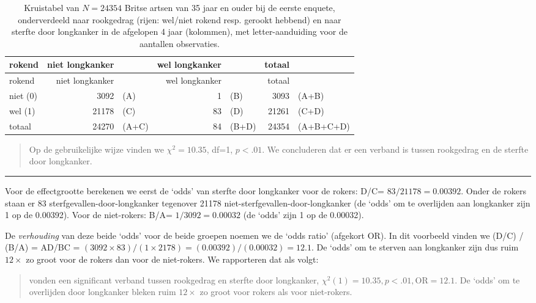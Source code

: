 \documentclass[
]{book}
\begin{document}
\begin{longtable}[]{@{}lrlrlrl@{}}
\caption{\label{tab:dollhill} Kruistabel van \(N=24354\) Britse artsen van 35 jaar en ouder bij de eerste enquete, onderverdeeld naar rookgedrag (rijen: wel/niet rokend resp. gerookt hebbend) en naar sterfte door longkanker in de afgelopen 4 jaar (kolommen), met letter-aanduiding voor de aantallen observaties.}\tabularnewline
\toprule
rokend & niet longkanker & & wel longkanker & & totaal &\tabularnewline
\midrule
\endfirsthead
\toprule
rokend & niet longkanker & & wel longkanker & & totaal &\tabularnewline
\midrule
\endhead
niet (0) & 3092 & (A) & 1 & (B) & 3093 & (A+B)\tabularnewline
wel (1) & 21178 & (C) & 83 & (D) & 21261 & (C+D)\tabularnewline
totaal & 24270 & (A+C) & 84 & (B+D) & 24354 & (A+B+C+D)\tabularnewline
\bottomrule
\end{longtable}

\begin{quote}
Op de gebruikelijke wijze vinden we \(\chi^2=10.35\), df=1, \(p<.01\). We
concluderen dat er een verband is tussen rookgedrag en de sterfte door
longkanker.
\end{quote}

\begin{center}\rule{0.5\linewidth}{0.5pt}\end{center}

Voor de effectgrootte berekenen we eerst de `odds' van sterfte door
longkanker voor de rokers: D/C= \(83/21178 =0.00392\). Onder de rokers
staan er 83 sterfgevallen-door-longkanker tegenover 21178
niet-sterfgevallen-door-longkanker (de `odds' om te overlijden aan
longkanker zijn 1 op de 0.00392). Voor de niet-rokers: B/A=
\(1/3092 =0.00032\) (de `odds' zijn 1 op de 0.00032).

De \emph{verhouding} van deze beide `odds' voor de beide groepen noemen we de
`odds ratio' (afgekort OR). In dit voorbeeld vinden we (D/C) / (B/A) =
AD/BC =
\((3092 \times 83) / (1 \times 2178) = (0.00392)/(0.00032) = 12.1\). De
`odds' om te sterven aan longkanker zijn dus ruim \(12\times\) zo groot
voor de rokers dan voor de niet-rokers. We rapporteren dat als volgt:

\begin{quote}
\citet{DollHill1956} vonden een significant verband tussen
rookgedrag en sterfte door longkanker,
\(\chi^2(1)=10.35, p<.01, \textrm{OR}=12.1\). De `odds' om te overlijden
door longkanker bleken ruim \(12\times\) zo groot voor rokers als voor
niet-rokers.
\end{quote}
\end{document}
